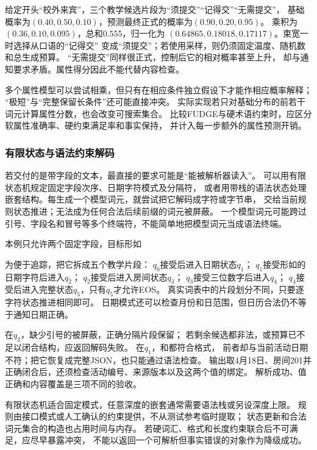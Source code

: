 给定开头“校外来宾”，三个教学候选片段为“须提交”“记得交”“无需提交”，
基础概率为$(0.40,0.50,0.10)$，预测最终正式的概率为$(0.90,0.20,0.95)$。
乘积为$(0.36,0.10,0.095)$，总和$0.555$，归一化为
$(0.64865,0.18018,0.17117)$。束宽一时选择从口语的“记得交”
变成“须提交”；若使用采样，则仍须固定温度、随机数和总生成预算。
“无需提交”同样很正式，控制后它的相对概率甚至上升，
却与通知要求矛盾。属性得分因此不能代替内容检查。

多个属性模型可以尝试相乘，但只有在相应条件独立假设下才能作相应概率解释；
“极短”与“完整保留长条件”还可能直接冲突。
实际实现若只对基础分布的前若干词元计算属性分数，也会改变可搜索集合。
比较FUDGE与硬术语约束时，应区分软属性准确率、硬约束满足率和事实保持，
并计入每一步额外的属性预测开销。

\subsubsection{有限状态与语法约束解码}
\label{sec:nlp-generation-grammar}

若交付的是带字段的文本，最直接的要求可能是“能被解析器读入”。
可以用有限状态机规定固定字段次序、日期字符模式及分隔符，
或者用带栈的语法状态处理嵌套结构。每生成一个模型词元，就尝试把它解码成字符或字节串，
交给当前规则状态推进；无法成为任何合法后续前缀的词元被屏蔽。
一个模型词元可能跨过引号、字段名和冒号等多个终端符，不能简单地把模型词元当成语法终端。

本例只允许两个固定字段，目标形如
\begin{center}
\end{center}
为便于追踪，把它拆成五个教学片段：
$q_0$接受后进入日期状态$q_1$；
$q_1$接受形如的日期字符后进入$q_2$；
$q_2$接受后进入房间状态$q_3$；
$q_3$接受三位数字后进入$q_4$；
$q_4$接受后进入完整状态$q_5$，只有$q_5$才允许EOS。
真实词表中的片段划分不同，只要逐字符状态推进相同即可。
日期模式还可以检查月份和日范围，但日历合法仍不等于通知日期正确。

在$q_2$，缺少引号的被屏蔽，正确分隔片段保留；
若剩余候选都非法，或预算已不足以闭合结构，应返回解码失败。
在$q_1$，和都符合格式，
前者却与当前活动日期不符；把它恢复成完整JSON，也只能通过语法检查。
输出取4月18日、房间201并正确闭合后，还须检查活动编号、来源版本以及这两个值的绑定。
解析成功、值正确和内容覆盖是三项不同的验收。

有限状态机适合固定模式，任意深度的嵌套通常需要语法栈或另设深度上限。
规则由接口模式或人工确认的约束提供，不从测试参考临时提取；
状态更新和合法词元集合的构造也占用时间与内存。
若硬词汇、格式和长度约束联合后不可满足，应尽早暴露冲突，
不能以返回一个可解析但事实错误的对象作为降级成功。

